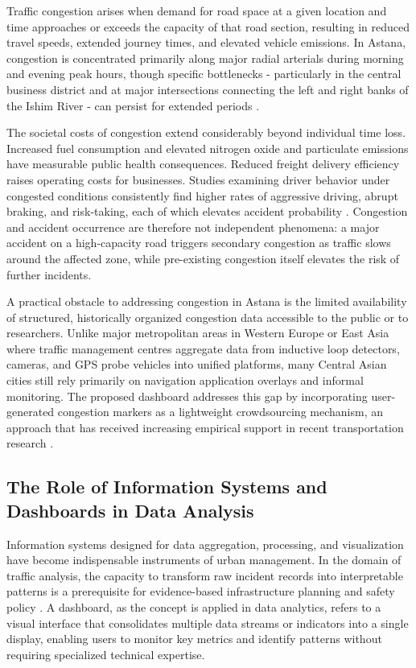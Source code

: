 \documentclass[12pt,a4paper]{report}
\begin{document}
Traffic congestion arises when demand for road space at a given
location and time approaches or exceeds the capacity of that road
section, resulting in reduced travel speeds, extended journey times,
and elevated vehicle emissions. In Astana, congestion is concentrated
primarily along major radial arterials during morning and evening
peak hours, though specific bottlenecks - particularly in the central
business district and at major intersections connecting the left and
right banks of the Ishim River - can persist for extended periods
\cite{oecd2022}.

The societal costs of congestion extend considerably beyond individual
time loss. Increased fuel consumption and elevated nitrogen oxide and
particulate emissions have measurable public health consequences.
Reduced freight delivery efficiency raises operating costs for
businesses. Studies examining driver behavior under congested
conditions consistently find higher rates of aggressive driving,
abrupt braking, and risk-taking, each of which elevates accident
probability \cite{oecd2022}. Congestion and accident occurrence are
therefore not independent phenomena: a major accident on a high-capacity
road triggers secondary congestion as traffic slows around the affected
zone, while pre-existing congestion itself elevates the risk of
further incidents.

A practical obstacle to addressing congestion in Astana is the limited
availability of structured, historically organized congestion data
accessible to the public or to researchers. Unlike major metropolitan
areas in Western Europe or East Asia where traffic management centres
aggregate data from inductive loop detectors, cameras, and GPS probe
vehicles into unified platforms, many Central Asian cities still rely
primarily on navigation application overlays and informal monitoring.
The proposed dashboard addresses this gap by incorporating
user-generated congestion markers as a lightweight crowdsourcing
mechanism, an approach that has received increasing empirical support
in recent transportation research \cite{janez2022, guo2024}.

\subsection{The Role of Information Systems and Dashboards in Data Analysis}

Information systems designed for data aggregation, processing, and
visualization have become indispensable instruments of urban
management. In the domain of traffic analysis, the capacity to
transform raw incident records into interpretable patterns is a
prerequisite for evidence-based infrastructure planning and safety
policy \cite{praharaj2022}. A dashboard, as the concept is applied in
data analytics, refers to a visual interface that consolidates multiple
data streams or indicators into a single display, enabling users to
monitor key metrics and identify patterns without requiring specialized
technical expertise.
\end{document}
